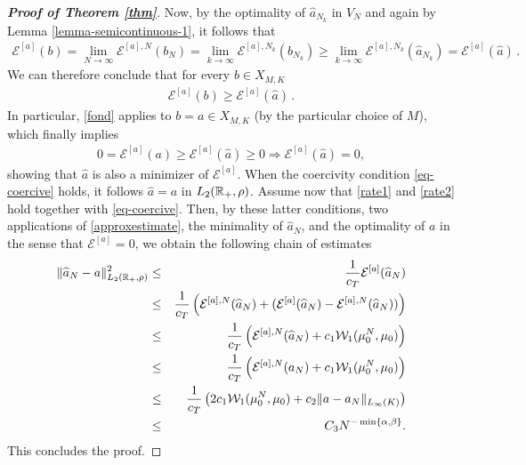 \begin{proof}[\normalfont\bf Proof of Theorem \ref{thm}]
	Now, by the optimality of $\widehat a_{N_k}$ in $V_N$ and again by Lemma \ref{lemma-semicontinuous-1}, it follows that
	\begin{align*}
		\mathcal E^{[a]} (b)=\lim_{N\rightarrow\infty}\mathcal E^{[a],N}(b_N)
			= \lim_{k \rightarrow\infty}\mathcal E^{[a],N_k}(b_{N_k})
			\geq\lim_{k \rightarrow\infty}\mathcal E^{[a],N_k}(\widehat a_{N_k})
			= \mathcal E^{[a]} (\widehat a)\,.
	\end{align*}
	We can therefore conclude that for every $b \in X_{M,K}$
	\begin{align}\label{fond}
		 \mathcal E^{[a]} (b)\geq \mathcal E^{[a]} (\widehat a)\,.
	\end{align}
 In particular, \eqref{fond} applies to $b=a\in X_{M,K}$ (by the particular choice of $M$), which finally implies
	\begin{align*}
		0=\mathcal E^{[a]} (a)\geq \mathcal E^{[a]} (\widehat a)\geq 0\Longrightarrow \mathcal E^{[a]} (\widehat a)=0,
	\end{align*}
	showing that $\widehat a$ is also a minimizer of $\mathcal E^{[a]}$. When the coercivity condition \eqref{eq-coercive} holds,  it follows $\widehat a=a$ in  $L_2(\mathbb{R}_+,\rho)$.
Assume now that \eqref{rate1} and \eqref{rate2} hold together with  \eqref{eq-coercive}. Then, by these latter conditions, two applications of \eqref{approxestimate}, the minimality of $\widehat a_N$, and the optimality of
$a$ in the sense that $\mathcal E^{[a]}=0$, we obtain the following chain of estimates
\begin{eqnarray*}
\| \widehat a_N - a \|_{L_2(\mathbb{R}_+,\rho)}^2 &\leq& \frac{1}{c_T}  \mathcal E^{[a]}(\widehat a_N) \\
&\leq& \frac{1}{c_T} \left ( \mathcal E^{[a],N}(\widehat a_N) + ( \mathcal E^{[a]}(\widehat a_N)- \mathcal E^{[a],N}(\widehat a_N))  \right )\\
&\leq & \frac{1}{c_T} \left (\mathcal E^{[a],N}(\widehat a_N) +  c_1 \mathcal W_1(\mu_0^N,\mu_0) \right ) \\
&\leq &\frac{1}{c_T} \left (\mathcal E^{[a],N}(a_N) +  c_1 \mathcal W_1(\mu_0^N,\mu_0) \right ) \\
&\leq &\frac{1}{c_T} \left (2 c_1 \mathcal W_1(\mu_0^N,\mu_0) + c_2 \| a - a_N \|_{L_\infty(K)} \right ) \\
&\leq & C_3  N^{-\min \{\alpha,\beta\}}.
\end{eqnarray*} 
This concludes the proof.
\end{proof}